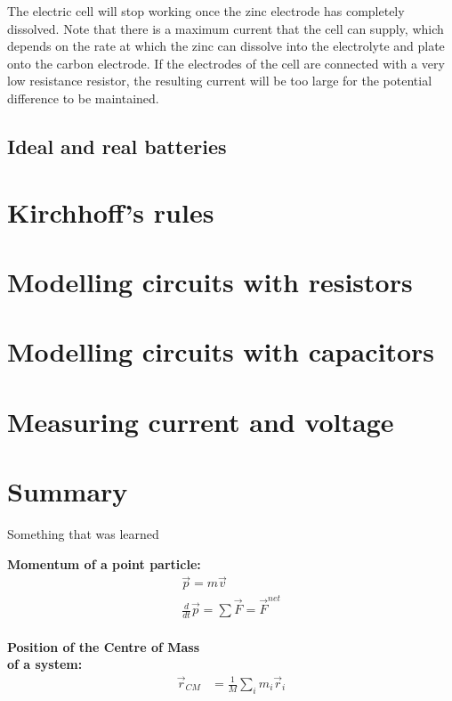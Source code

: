 The electric cell will stop working once the zinc electrode has completely dissolved. Note that there is a maximum current that the cell can supply, which depends on the rate at which the zinc can dissolve into the electrolyte and plate onto the carbon electrode. If the electrodes of the cell are connected with a very low resistance resistor, the resulting current will be too large for the potential difference to be maintained. 


\subsection{Ideal and real batteries}


\section{Kirchhoff's rules}

\section{Modelling circuits with resistors}

\section{Modelling circuits with capacitors}

\section{Measuring current and voltage}

\newpage
\section{Summary}

\begin{chapterSummary}
 Something that was learned
\end{chapterSummary}

\newpage
\begin{importantEquations}
\medskip
\begin{multicols}{2}
\textbf{Momentum of a point particle:}
\begin{align*}
\vec p = m\vec v \\
\frac{d}{dt}\vec p = \sum \vec F = \vec F^{net}
\end{align*}
\columnbreak
\\
\textbf{Position of the Centre of Mass \\ of a system:}
\begin{align*}
\vec r_{CM} &=\frac{1}{M}\sum_i m_i\vec r_i 
\end{align*}
\medskip
\end{multicols}
\end{importantEquations}

